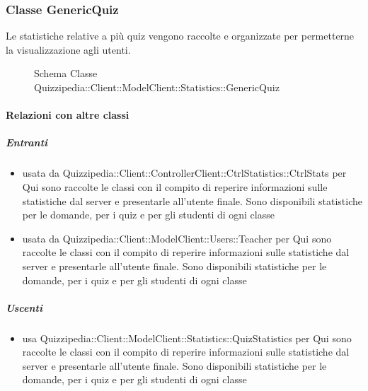 \subsubsection{Classe GenericQuiz}
Le statistiche relative a più quiz vengono raccolte e organizzate per permetterne la visualizzazione agli utenti.
\begin{figure}[H]
\centering
\noindent{}
\caption[Schema Classe GenericQuiz]{Schema Classe Quizzipedia::Client::ModelClient::Statistics::GenericQuiz}
\end{figure}
\paragraph{Relazioni con altre classi}
\subparagraph{Entranti}
\begin{itemize}
\item usata da Quizzipedia::Client::ControllerClient::CtrlStatistics::CtrlStats per Qui sono raccolte le classi con il compito di reperire informazioni sulle statistiche dal server e presentarle all'utente finale. Sono disponibili statistiche per le domande, per i quiz e per gli studenti di ogni classe
\item usata da Quizzipedia::Client::ModelClient::Users::Teacher per Qui sono raccolte le classi con il compito di reperire informazioni sulle statistiche dal server e presentarle all'utente finale. Sono disponibili statistiche per le domande, per i quiz e per gli studenti di ogni classe
\end{itemize}
\subparagraph{Uscenti}
\begin{itemize}
\item usa Quizzipedia::Client::ModelClient::Statistics::QuizStatistics per Qui sono raccolte le classi con il compito di reperire informazioni sulle statistiche dal server e presentarle all'utente finale. Sono disponibili statistiche per le domande, per i quiz e per gli studenti di ogni classe
\end{itemize}
